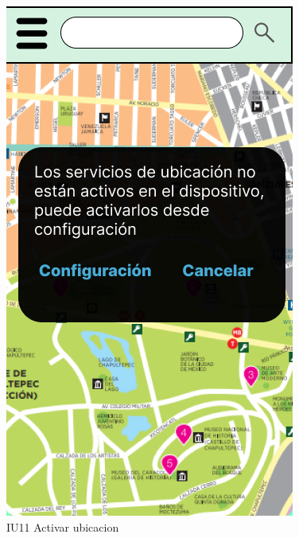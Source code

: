 \begin{figure}[h]
    \begin{minipage}{0.5\textwidth}
        \centering
        \includegraphics[width=.7\linewidth]{Pantallas Prototipo3/IU11 - Activar ubicacion.jpg}
        \caption{IU11 Activar ubicacion}
    \end{minipage}
    \begin{minipage}{0.5\textwidth}
        \centering

\end{minipage}
\end{figure}
